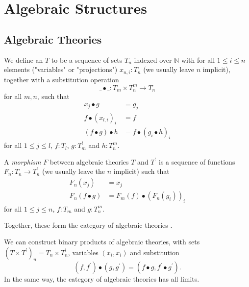 \chapter{Algebraic Structures}

\section{Algebraic Theories}\label{sec:algebraic-theories}

\begin{definition}
  We define an  $ T $ to be a sequence of sets $ T_n $ indexed over $ \mathbb N $ with for all $ 1 \leq i \leq n $ elements ("variables" or "projections") $ x_{n, i}: T_n $ (we usually leave $ n $ implicit), together with a substitution operation
  \[ \_ \bullet \_: T_m \times T_n^m \to T_n \]
  for all $ m, n $, such that
  \begin{align*}
    x_j \bullet g &= g_j\\
    f \bullet (x_{l, i})_i &= f\\
    (f \bullet g) \bullet h &= f \bullet (g_i \bullet h)_i
  \end{align*}
  for all $ 1 \leq j \leq l $, $ f: T_l $, $ g: T_m^l $ and $ h: T_n^m $.
\end{definition}

\begin{definition}
  A \textit{morphism} $ F $ between algebraic theories $ T $ and $ T^\prime $ is a sequence of functions $ F_n: T_n \to T^\prime_n $ (we usually leave the $ n $ implicit) such that
  \begin{align*}
    F_n(x_j) &= x_j\\
    F_n(f \bullet g) &= F_m(f) \bullet (F_n(g_i))_i
  \end{align*}
  for all $ 1 \leq j \leq n $, $ f: T_m $ and $ g: T_n^m $.
\end{definition}

Together, these form the category of algebraic theories \iindex{$ \AlgTh $}.

\begin{remark}
  We can construct binary products of algebraic theories, with sets $ (T \times T^\prime)_n = T_n \times T^\prime_n $, variables $ (x_i, x_i) $ and substitution
  \[ (f, f^\prime) \bullet (g, g^\prime) = (f \bullet g, f^\prime \bullet g^\prime). \]
  In the same way, the category of algebraic theories has all limits.
\end{remark}

